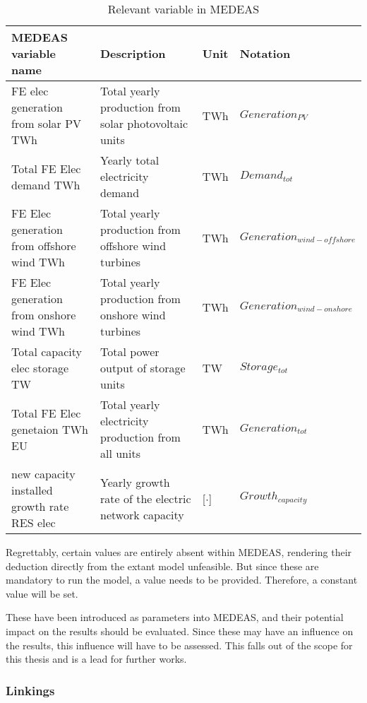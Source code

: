 \begin{table}[h]
    \centering
    \begin{tabular}{|p{5cm}|p{5cm}|p{1cm}|p{4cm}|} \hline 
    MEDEAS variable name &  Description & Unit & Notation \\ \hline
     {\color{red} FE elec generation from solar PV TWh} & Total yearly production from solar photovoltaic units & TWh & {\color{red}$Generation_{PV}$} \\ \hline 
     {\color{red} Total FE Elec demand TWh} & Yearly total electricity demand & TWh & {\color{red}$Demand_{tot}$ } \\ \hline 
     {\color{red} FE Elec generation from offshore wind TWh} & Total yearly production from offshore wind turbines & TWh & {\color{red}$Generation_{wind-offshore}$ } \\ \hline 
     {\color{red} FE Elec generation from onshore wind TWh} & Total yearly production from onshore wind turbines & TWh & {\color{red}$Generation_{wind-onshore}$ } \\ \hline 
     {\color{red} Total capacity elec storage TW} & Total power output of storage units & TW & {\color{red}$Storage_{tot}$ } \\ \hline 
     {\color{red} Total FE Elec genetaion TWh EU} & Total yearly electricity production from all units & TWh & {\color{red}$Generation_{tot}$ } \\ \hline 
     {\color{red} new capacity installed growth rate RES elec} & Yearly growth rate of the electric network capacity & [$\cdot$] & {\color{red}$Growth_{capacity}$ } \\ \hline
    \end{tabular}
    \caption{Relevant variable in MEDEAS}
    \label{tab:medeas-vars}
\end{table}

Regrettably, certain values are entirely absent within MEDEAS, rendering their deduction directly from the extant model unfeasible. But since these are mandatory to run the model, a value needs to be provided. Therefore, a constant value will be set.

These have been introduced as parameters into MEDEAS, and their potential impact on the results should be evaluated. Since these may have an influence on the results, this influence will have to be assessed. This falls out of the scope for this thesis and is a lead for further works.

\subsubsection{Linkings}

